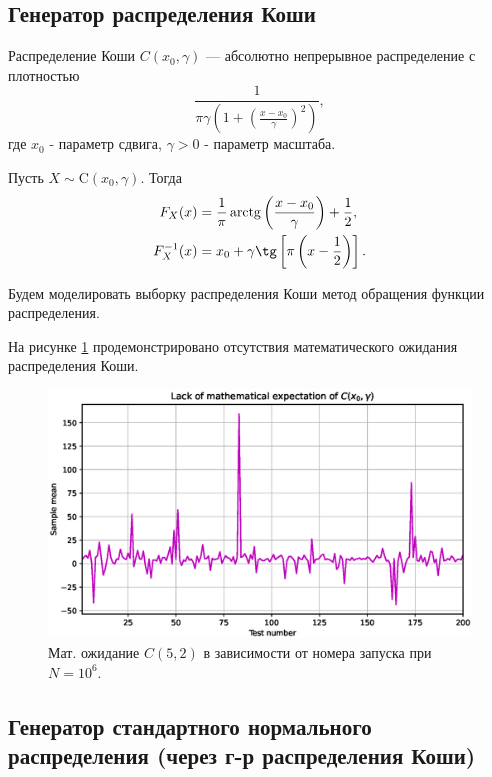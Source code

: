 \documentclass[11pt]{report}
\begin{document}
\subsection{Генератор распределения Коши}

\begin{definition}
Распределение Коши $C(x_0,\gamma)$ --- абсолютно непрерывное распределение с плотностью
$$
\dfrac{1}{\pi\gamma\left(1+(\frac{x-x_0}{\gamma})^2 \right)},
$$
где $x_0$ - параметр сдвига, $\gamma>0$ - параметр масштаба.
\end{definition}

Пусть $X\sim\mathrm{C}(x_0,\gamma)$. Тогда
$$
\begin{aligned}
F_X(x) &= \dfrac{1}{\pi}\operatorname{arctg}\left(\dfrac{x-x_0}{\gamma}\right) + \dfrac{1}{2}, \\
F_X^{-1}(x) &= x_0 + \gamma\tg\left[\pi\left(x-\dfrac{1}{2}\right)\right].
\end{aligned}
$$

Будем моделировать выборку распределения Коши метод обращения функции распределения.

На рисунке \ref{fig:cauchy-lack} продемонстрировано отсутствия математического ожидания распределения Коши.

\begin{figure}[H]
    \centering
    \includegraphics[width=0.9\linewidth]{images/cauchy-lack.eps}
    \caption{Мат. ожидание $C(5,2)$ в зависимости от номера запуска при $N=10^6$.}
    \label{fig:cauchy-lack}
\end{figure}

\subsection{Генератор стандартного нормального распределения (через г-р распределения Коши)}
\end{document}
